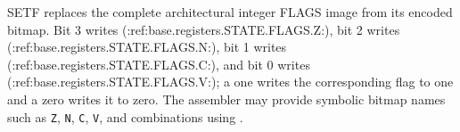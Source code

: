 SETF replaces the complete architectural integer FLAGS image from its encoded bitmap. Bit 3 writes (:ref:base.registers.STATE.FLAGS.Z:), bit 2 writes (:ref:base.registers.STATE.FLAGS.N:), bit 1 writes (:ref:base.registers.STATE.FLAGS.C:), and bit 0 writes (:ref:base.registers.STATE.FLAGS.V:); a one writes the corresponding flag to one and a zero writes it to zero. The assembler may provide symbolic bitmap names such as \texttt{Z}, \texttt{N}, \texttt{C}, \texttt{V}, and combinations using \textbar{}.
